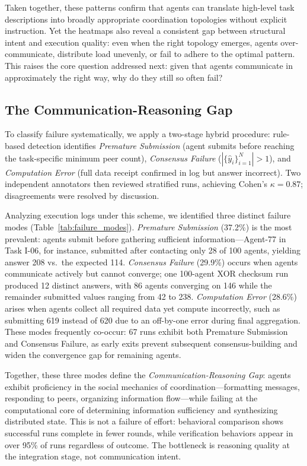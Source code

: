 Taken together, these patterns confirm that agents can translate high-level task descriptions into broadly appropriate coordination topologies without explicit instruction. 
Yet the heatmaps also reveal a consistent gap between structural intent and execution quality: even when the right topology emerges, agents over-communicate, distribute load unevenly, or fail to adhere to the optimal pattern. 
This raises the core question addressed next: given that agents communicate in approximately the right way, why do they still so often fail?

\subsection{The Communication-Reasoning Gap}

To classify failure systematically, we apply a two-stage hybrid procedure: rule-based detection identifies \textit{Premature Submission} (agent submits before reaching the task-specific minimum peer count), \textit{Consensus Failure} ($|\{\hat{y}_i\}_{i=1}^N| > 1$), and \textit{Computation Error} (full data receipt confirmed in log but answer incorrect). 
Two independent annotators then reviewed stratified runs, achieving Cohen's $\kappa = 0.87$; disagreements were resolved by discussion.

Analyzing execution logs under this scheme, we identified three distinct failure modes (Table~\ref{tab:failure_modes}). 
\textit{Premature Submission} (37.2\%) is the most prevalent: agents submit before gathering sufficient information---Agent-77 in Task I-06, for instance, submitted after contacting only 28 of 100 agents, yielding answer 208 vs.\ the expected 114. 
\textit{Consensus Failure} (29.9\%) occurs when agents communicate actively but cannot converge; one 100-agent XOR checksum run produced 12 distinct answers, with 86 agents converging on 146 while the remainder submitted values ranging from 42 to 238. 
\textit{Computation Error} (28.6\%) arises when agents collect all required data yet compute incorrectly, such as submitting 619 instead of 620 due to an off-by-one error during final aggregation. 
These modes frequently co-occur: 67 runs exhibit both Premature Submission and Consensus Failure, as early exits prevent subsequent consensus-building and widen the convergence gap for remaining agents.



Together, these three modes define the \textit{Communication-Reasoning Gap}: agents exhibit proficiency in the social mechanics of coordination---formatting messages, responding to peers, organizing information flow---while failing at the computational core of determining information sufficiency and synthesizing distributed state. 
This is not a failure of effort: behavioral comparison shows successful runs complete in fewer rounds, while verification behaviors appear in over 95\% of runs regardless of outcome. The bottleneck is reasoning quality at the integration stage, not communication intent.

